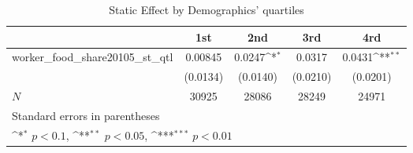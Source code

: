 \begin{table}[htbp]\centering
\def\sym#1{\ifmmode^{#1}\else\(^{#1}\)\fi}
\caption{Static Effect by Demographics' quartiles}
\begin{tabular}{l*{4}{c}}
\hline\hline
            &\multicolumn{1}{c}{1st}&\multicolumn{1}{c}{2nd}&\multicolumn{1}{c}{3rd}&\multicolumn{1}{c}{4rd}\\
\hline
worker\_food\_share20105\_st\_qtl&     0.00845         &      0.0247\sym{*}  &      0.0317         &      0.0431\sym{**} \\
            &    (0.0134)         &    (0.0140)         &    (0.0210)         &    (0.0201)         \\
\hline
\(N\)       &       30925         &       28086         &       28249         &       24971         \\
\hline\hline
\multicolumn{5}{l}{\footnotesize Standard errors in parentheses}\\
\multicolumn{5}{l}{\footnotesize \sym{*} \(p<0.1\), \sym{**} \(p<0.05\), \sym{***} \(p<0.01\)}\\
\end{tabular}
\end{table}
